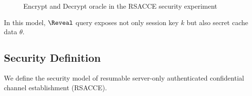 \begin{figure*}[!htb]
\begin{center}
\caption{Encrypt and Decrypt oracle in the RSACCE security experiment}
 \label{fig:LHAE_rsacce}
\end{center}
\end{figure*}


 In this model, $\Reveal$ query exposes not only session key $k$ but also secret cache data $\theta$.

\subsection{Security Definition} \label{sec:sec_def}

We define the security model of resumable server-only authenticated confidential channel establishment
(RSACCE).


